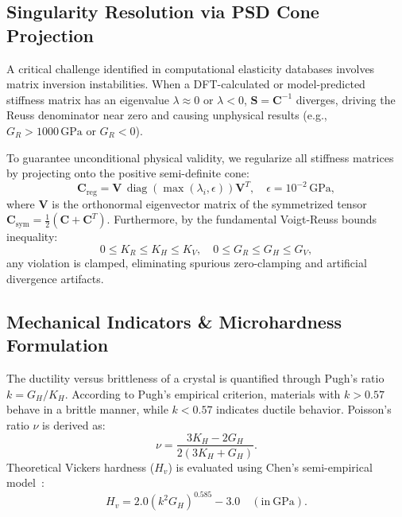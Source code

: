 \documentclass[twocolumn,10pt,aps,prb,superscriptaddress,floatfix]{revtex4-2}
\begin{document}
\subsection{Singularity Resolution via PSD Cone Projection}
A critical challenge identified in computational elasticity databases involves matrix inversion instabilities. When a DFT-calculated or model-predicted stiffness matrix has an eigenvalue $\lambda \approx 0$ or $\lambda < 0$, $\bm{S} = \bm{C}^{-1}$ diverges, driving the Reuss denominator near zero and causing unphysical results (e.g., $G_R > 1000\,\mathrm{GPa}$ or $G_R < 0$).

To guarantee unconditional physical validity, we regularize all stiffness matrices by projecting onto the positive semi-definite cone:
\begin{equation}
\bm{C}_{\mathrm{reg}} = \bm{V} \, \operatorname{diag}\left( \max(\lambda_i, \epsilon) \right) \bm{V}^T, \quad \epsilon = 10^{-2}\,\mathrm{GPa},
\label{eq:psd_projection}
\end{equation}
where $\bm{V}$ is the orthonormal eigenvector matrix of the symmetrized tensor $\bm{C}_{\mathrm{sym}} = \frac{1}{2}(\bm{C} + \bm{C}^T)$. Furthermore, by the fundamental Voigt-Reuss bounds inequality:
\begin{equation}
0 \le K_R \le K_H \le K_V, \quad 0 \le G_R \le G_H \le G_V,
\label{eq:inequality}
\end{equation}
any violation is clamped, eliminating spurious zero-clamping and artificial divergence artifacts.

\subsection{Mechanical Indicators & Microhardness Formulation}
The ductility versus brittleness of a crystal is quantified through Pugh's ratio $k = G_H / K_H$. According to Pugh's empirical criterion, materials with $k > 0.57$ behave in a brittle manner, while $k < 0.57$ indicates ductile behavior. Poisson's ratio $\nu$ is derived as:
\begin{equation}
\nu = \frac{3K_H - 2G_H}{2(3K_H + G_H)}.
\label{eq:poisson}
\end{equation}
Theoretical Vickers hardness ($H_v$) is evaluated using Chen's semi-empirical model~\cite{chen2011}:
\begin{equation}
H_v = 2.0 \left( k^2 G_H \right)^{0.585} - 3.0 \quad (\mathrm{in~GPa}).
\label{eq:hardness}
\end{equation}
\end{document}
